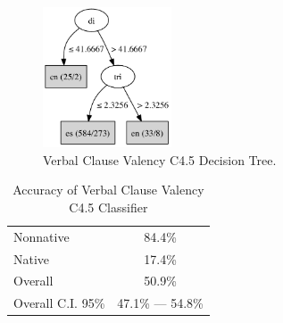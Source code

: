 \documentclass[main.tex]{subfiles}
\begin{document}
\begin{figure}[ht]
\centering
\includegraphics[width=1.5in]{c45-val.pdf}
\caption{Verbal Clause Valency C4.5 Decision Tree.}
\label{fig:c4.5-val}
\end{figure}

\begin{table}[ht]
\centering
\caption{Accuracy of Verbal Clause Valency C4.5 Classifier}
\begin{tabular}{l c}
\toprule
Nonnative & 84.4\% \\
Native & 17.4\% \\
Overall & 50.9\% \\
Overall C.I. 95\% & 47.1\% --- 54.8\%\\
\bottomrule
\end{tabular}
\label{table:val-results}
\end{table}
\end{document}
